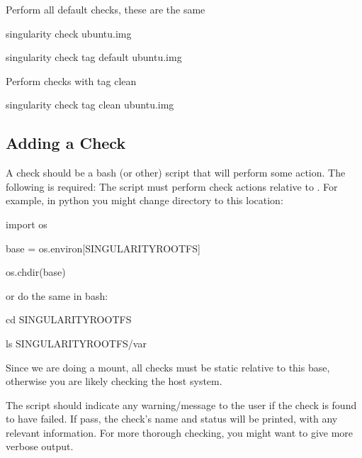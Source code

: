\documentclass[letterpaper,10pt,english]{sphinxmanual}
\begin{document}
%
\begin{sphinxVerbatim}[commandchars=\\\{\}]
\PYGZsh{} Perform all default checks, these are the same

\PYGZdl{} singularity check ubuntu.img

\PYGZdl{} singularity check \PYGZhy{}\PYGZhy{}tag default ubuntu.img


\PYGZsh{} Perform checks with tag \PYGZdq{}clean\PYGZdq{}

\PYGZdl{} singularity check \PYGZhy{}\PYGZhy{}tag clean ubuntu.img
\end{sphinxVerbatim}


\subsection{Adding a Check}
\label{\detokenize{container_checks:adding-a-check}}
A check should be a bash (or other) script that will perform some
action. The following is required:
 The script must perform check
actions relative to . For example, in python you might change
directory to this location:

%
\begin{sphinxVerbatim}[commandchars=\\\{\}]
import os

base = os.environ[\PYGZdq{}SINGULARITY\PYGZus{}ROOTFS\PYGZdq{}]

os.chdir(base)
\end{sphinxVerbatim}

or do the same in bash:

%
\begin{sphinxVerbatim}[commandchars=\\\{\}]
cd \PYGZdl{}SINGULARITY\PYGZus{}ROOTFS

ls \PYGZdl{}SINGULARITY\PYGZus{}ROOTFS/var
\end{sphinxVerbatim}

Since we are doing a mount, all checks must be static relative to this
base, otherwise you are likely checking the host system.

 The script should indicate any warning/message to the user
if the check is found to have failed. If pass, the check’s name and
status will be printed, with any relevant information. For more
thorough checking, you might want to give more verbose output.
\end{document}
